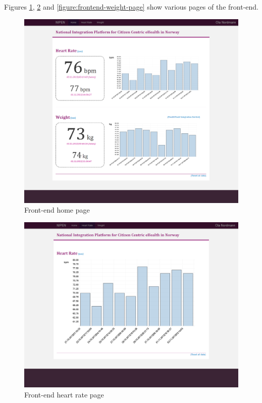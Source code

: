 Figures \ref{figure:frontend-main-page}, \ref{figure:frontend-heart-rate-page} and \ref{figure:frontend-weight-page}
show various pages of the front-end.


\begin{figure}[H]
\centering
\includegraphics[scale=0.4]{../Figures/frontend-main-page.png}
\caption{Front-end home page}
\label{figure:frontend-main-page}
\end{figure}

\begin{figure}[H]
\centering
\includegraphics[scale=0.4]{../Figures/frontend-heart-rate-page.png}
\caption{Front-end heart rate page}
\label{figure:frontend-heart-rate-page}
\end{figure}

